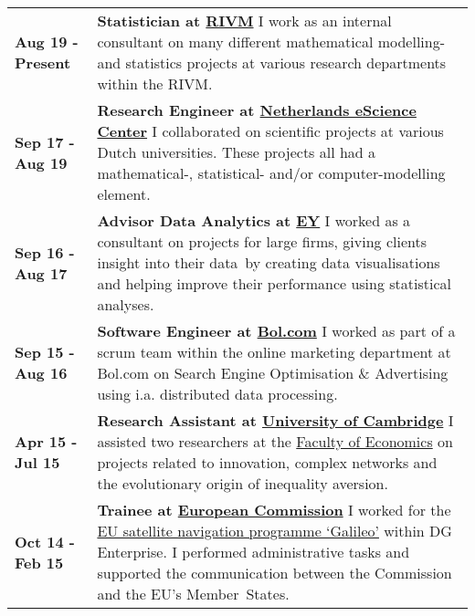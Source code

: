 \documentclass[a4paper,8pt]{extarticle}
\begin{document}
\begin{center}
\setlength{\tabcolsep}{0mm}
\begin{tabular}{p{}p{}}
\textbf{Aug 19 - Present}&\textbf{Statistician at \href{https://www.rivm.nl/}{RIVM}}\newline
I work as an internal consultant on many different mathematical modelling- and statistics projects at various research departments within the RIVM.
\vspace{2mm}\\
\textbf{Sep 17 - Aug 19}&\textbf{Research Engineer at \href{https://www.esciencecenter.nl}{Netherlands eScience Center}}\newline
I collaborated on scientific projects at various Dutch universities. These projects all had a mathematical-, statistical- and/or computer-modelling element.
\vspace{2mm}\\
\textbf{Sep 16 - Aug 17}&\textbf{Advisor Data Analytics at \href{http://www.ey.com/nl/nl}{ EY}}\newline
I worked as a consultant on projects for large firms, giving clients insight into their data~by creating data visualisations and helping improve their performance using statistical analyses.\vspace{2mm}\\
\textbf{Sep 15 - Aug 16}&\textbf{Software Engineer at \href{https://www.bol.com}{Bol.com}}\newline
I worked as part of a scrum team within the online marketing department at Bol.com on Search Engine Optimisation \& Advertising using i.a. distributed data processing.\vspace{2mm}\\
\textbf{Apr 15 - Jul 15}&\textbf{Research Assistant at \href{https://www.cam.ac.uk}{University of Cambridge}}\newline
I assisted two researchers at the \href{http://www.econ.cam.ac.uk}{Faculty of Economics} on projects related to innovation, complex networks and the evolutionary origin of inequality aversion.
\vspace{2mm}\\
\textbf{Oct 14 - Feb 15}&\textbf{Trainee at \href{https://ec.europa.eu/stages/}{European Commission}}\newline
I worked for the \href{https://www.gsa.europa.eu}{EU satellite navigation programme `Galileo'} within DG Enterprise. I performed administrative tasks and supported the communication between the Commission and the EU's Member~States.
\end{tabular}
\end{center}
\end{document}
